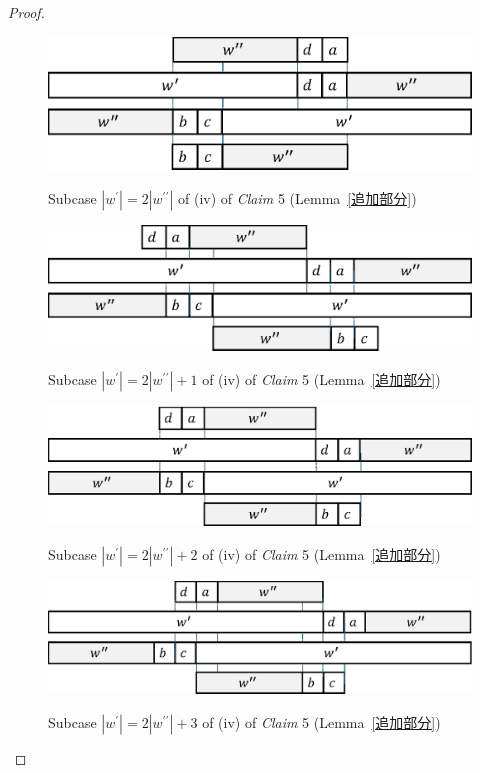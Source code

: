 \begin{proof}
\begin{figure}[t]
  \begin{center}
    \includegraphics[scale=0.45]{figs/w=2w_1.eps}
    \caption{Subcase $|w^{\prime}| = 2|w^{\prime\prime}|$ of (iv) of \textit{Claim} 5 (Lemma~\ref{追加部分})}\label{追加部分14}
    \bigskip
    \includegraphics[scale=0.45]{figs/w=2w_1+1.eps}
    \caption{Subcase $|w^{\prime}| = 2|w^{\prime\prime}| + 1$ of (iv) of \textit{Claim} 5 (Lemma~\ref{追加部分})}\label{追加部分13}
    \bigskip
    \includegraphics[scale=0.45]{figs/w=2w_1+2.eps}
    \caption{Subcase $|w^{\prime}| = 2|w^{\prime\prime}| + 2$ of (iv) of \textit{Claim} 5 (Lemma~\ref{追加部分})}\label{追加部分12}
    \bigskip
    \includegraphics[scale=0.45]{figs/w=2w_1+3.eps}
    \caption{Subcase $|w^{\prime}| = 2|w^{\prime\prime}| + 3$ of (iv) of \textit{Claim} 5 (Lemma~\ref{追加部分})}\label{追加部分11}
  \end{center}
\end{figure}


\end{proof}
